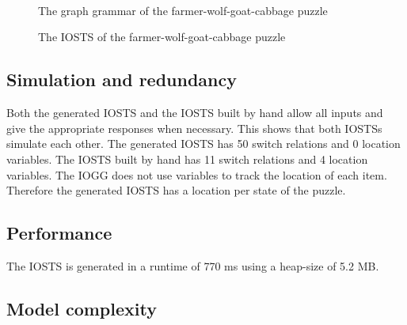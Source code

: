 \begin{figure}[ht]
  \begin{center}
    \hspace{20px}
    \\
    \hspace{20px}
    \\
    \\
  \end{center}
  \caption{The graph grammar of the farmer-wolf-goat-cabbage puzzle}
  \label{fig:gg-fwgc}
\end{figure}

\begin{figure}[ht]
  \begin{center}
    
  \end{center}
  \caption{The IOSTS of the farmer-wolf-goat-cabbage puzzle}
  \label{fig:sts-fwgc}
\end{figure}

\subsection{Simulation and redundancy}
Both the generated IOSTS and the IOSTS built by hand allow all inputs and give the appropriate responses when necessary. This shows that both IOSTSs simulate each other. The generated IOSTS has 50 switch relations and 0 location variables. The IOSTS built by hand has 11 switch relations and 4 location variables. The IOGG does not use variables to track the location of each item. Therefore the generated IOSTS has a location per state of the puzzle. 

\subsection{Performance}
The IOSTS is generated in a runtime of 770 ms using a heap-size of 5.2 MB.

\subsection{Model complexity}


